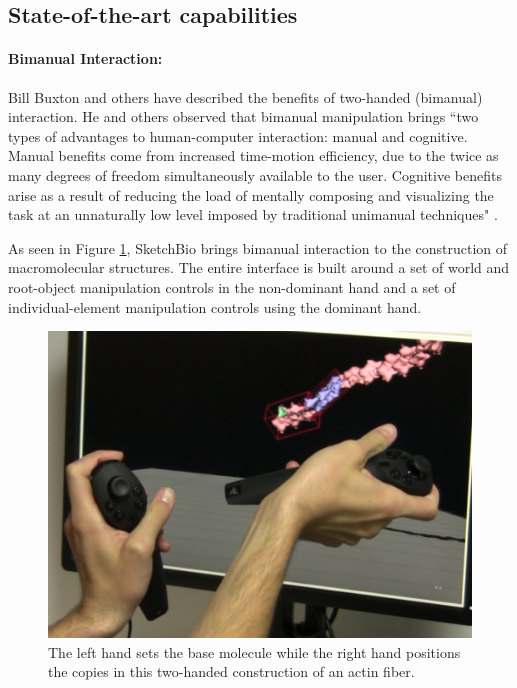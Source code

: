 \documentclass[twocolumn]{bmcart}%
\begin{document}
\subsection*{State-of-the-art capabilities}

\paragraph*{Bimanual Interaction:}
Bill Buxton and others have described the benefits of two-handed (bimanual) interaction.
He and others observed that bimanual manipulation brings ``two types of advantages to human-computer interaction: manual and cognitive. Manual benefits come from increased time-motion efficiency, due to the twice as many degrees of freedom simultaneously available to the user.
Cognitive benefits arise as a result of reducing the load of mentally composing and visualizing the task at an unnaturally low level imposed by traditional unimanual techniques" \cite{Leganchuk1998manual}.

As seen in Figure \ref{fig:two_hands}, SketchBio brings bimanual interaction to the construction of macromolecular structures.
The entire interface is built around a set of world and root-object manipulation controls in the non-dominant hand and a set of individual-element manipulation controls using the dominant hand.

\begin{figure}[ht]
\centering
\includegraphics[width=0.9\columnwidth]{two_hands.png}
\caption{The left hand sets the base molecule while the right hand positions the copies in this two-handed construction of an actin fiber.}
\label{fig:two_hands}
\end{figure}
\end{document}
